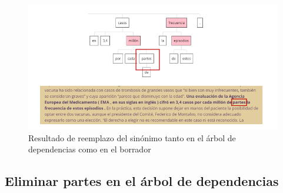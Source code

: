 \begin{figure}[h!]
	\centering
	
	
	\includegraphics[scale=1.0]{Imagenes/Figuras/CambioSinonimoArbolBorrador}
	
	
	\caption{Resultado de reemplazo del sinónimo tanto en el árbol de dependencias como en el borrador}
	\label{fig:resultadoSinonimos}
\end{figure}
\subsection{Eliminar partes en el árbol de dependencias}

